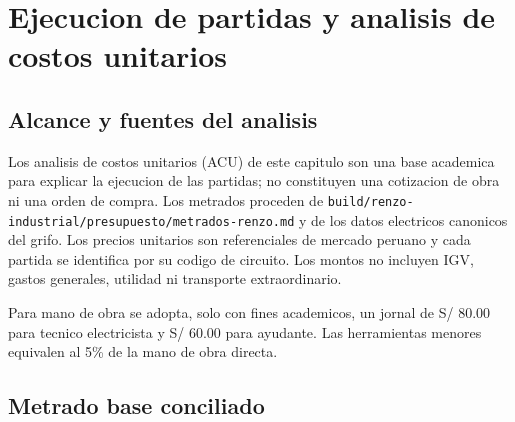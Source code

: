 \chapter{Ejecucion de partidas y analisis de costos unitarios}

\setcounter{section}{0}
\renewcommand{\thesection}{4.\arabic{section}.}
\renewcommand{\thesubsection}{4.\arabic{section}.\arabic{subsection}.}
\renewcommand{\theHsection}{partidas.\arabic{section}}
\renewcommand{\theHsubsection}{partidas.\arabic{section}.\arabic{subsection}}

\section{Alcance y fuentes del analisis}

Los analisis de costos unitarios (ACU) de este capitulo son una base academica
para explicar la ejecucion de las partidas; no constituyen una cotizacion de
obra ni una orden de compra. Los metrados proceden de
\texttt{build/renzo-industrial/presupuesto/metrados-renzo.md} y de los datos
electricos canonicos del grifo. Los precios unitarios son referenciales de
mercado peruano y cada partida se identifica por su codigo de circuito. Los
montos no incluyen IGV, gastos generales, utilidad ni transporte extraordinario.

Para mano de obra se adopta, solo con fines academicos, un jornal de
S/ 80.00 para tecnico electricista y S/ 60.00 para ayudante. Las herramientas
menores equivalen al 5\% de la mano de obra directa.

\section{Metrado base conciliado}

